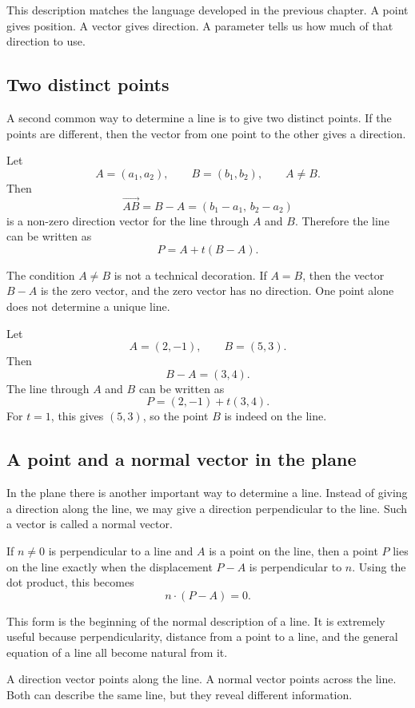 This description matches the language developed in the previous chapter. A point gives position. A vector gives direction. A parameter tells us how much of that direction to use.

\subsection*{Two distinct points}

A second common way to determine a line is to give two distinct points. If the points are different, then the vector from one point to the other gives a direction.

Let
\[
A=(a_1,a_2),
\qquad
B=(b_1,b_2),
\qquad
A\ne B.
\]
Then
\[
\overrightarrow{AB}=B-A=(b_1-a_1,\,b_2-a_2)
\]
is a non-zero direction vector for the line through \(A\) and \(B\). Therefore the line can be written as
\[
P=A+t(B-A).
\]

The condition \(A\ne B\) is not a technical decoration. If \(A=B\), then the vector \(B-A\) is the zero vector, and the zero vector has no direction. One point alone does not determine a unique line.

\begin{examplebox}
Let
\[
A=(2,-1),
\qquad
B=(5,3).
\]
Then
\[
B-A=(3,4).
\]
The line through \(A\) and \(B\) can be written as
\[
P=(2,-1)+t(3,4).
\]
For \(t=1\), this gives \((5,3)\), so the point \(B\) is indeed on the line.
\end{examplebox}

\subsection*{A point and a normal vector in the plane}

In the plane there is another important way to determine a line. Instead of giving a direction along the line, we may give a direction perpendicular to the line. Such a vector is called a normal vector.

If \(n\ne0\) is perpendicular to a line and \(A\) is a point on the line, then a point \(P\) lies on the line exactly when the displacement \(P-A\) is perpendicular to \(n\). Using the dot product, this becomes
\[
n\cdot(P-A)=0.
\]

This form is the beginning of the normal description of a line. It is extremely useful because perpendicularity, distance from a point to a line, and the general equation of a line all become natural from it.

\begin{remarkbox}
A direction vector points along the line. A normal vector points across the line. Both can describe the same line, but they reveal different information.
\end{remarkbox}

